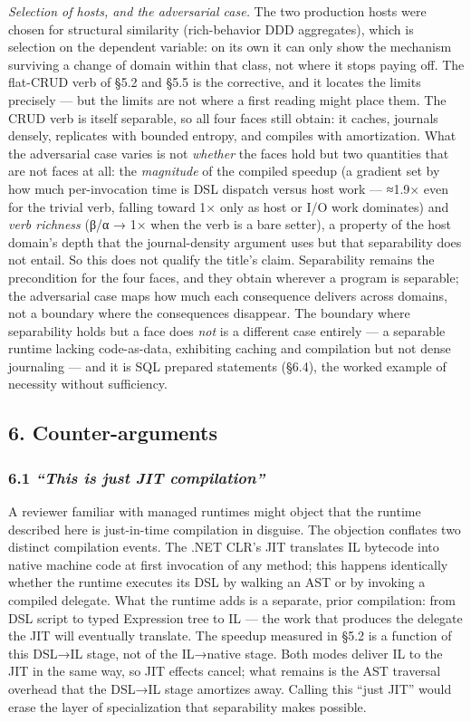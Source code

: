 \documentclass[
]{article}
\begin{document}
\emph{Selection of hosts, and the adversarial case.} The two production
hosts were chosen for structural similarity (rich-behavior DDD
aggregates), which is selection on the dependent variable: on its own it
can only show the mechanism surviving a change of domain within that
class, not where it stops paying off. The flat-CRUD verb of §5.2 and
§5.5 is the corrective, and it locates the limits precisely --- but the
limits are not where a first reading might place them. The CRUD verb is
itself separable, so all four faces still obtain: it caches, journals
densely, replicates with bounded entropy, and compiles with
amortization. What the adversarial case varies is not \emph{whether} the
faces hold but two quantities that are not faces at all: the
\emph{magnitude} of the compiled speedup (a gradient set by how much
per-invocation time is DSL dispatch versus host work --- ≈1.9× even for
the trivial verb, falling toward 1× only as host or I/O work dominates)
and \emph{verb richness} (β/α → 1× when the verb is a bare setter), a
property of the host domain's depth that the journal-density argument
uses but that separability does not entail. So this does not qualify the
title's claim. Separability remains the precondition for the four faces,
and they obtain wherever a program is separable; the adversarial case
maps how much each consequence delivers across domains, not a boundary
where the consequences disappear. The boundary where separability holds
but a face does \emph{not} is a different case entirely --- a separable
runtime lacking code-as-data, exhibiting caching and compilation but not
dense journaling --- and it is SQL prepared statements (§6.4), the
worked example of necessity without sufficiency.

\subsection{6. Counter-arguments}\label{counter-arguments}

\subsubsection{\texorpdfstring{6.1 \emph{``This is just JIT
compilation''}}{6.1 ``This is just JIT compilation''}}\label{this-is-just-jit-compilation}

A reviewer familiar with managed runtimes might object that the runtime
described here is just-in-time compilation in disguise. The objection
conflates two distinct compilation events. The .NET CLR's JIT translates
IL bytecode into native machine code at first invocation of any method;
this happens identically whether the runtime executes its DSL by walking
an AST or by invoking a compiled delegate. What the runtime adds is a
separate, prior compilation: from DSL script to typed Expression tree to
IL --- the work that produces the delegate the JIT will eventually
translate. The speedup measured in §5.2 is a function of this DSL→IL
stage, not of the IL→native stage. Both modes deliver IL to the JIT in
the same way, so JIT effects cancel; what remains is the AST traversal
overhead that the DSL→IL stage amortizes away. Calling this ``just JIT''
would erase the layer of specialization that separability makes
possible.
\end{document}

